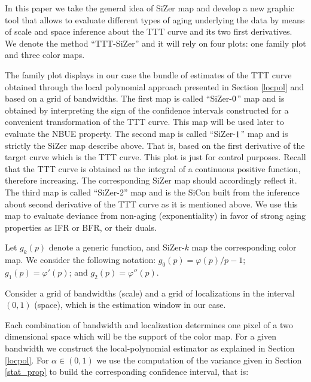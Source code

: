 \documentclass[preprint,12pt]{elsarticle}
\begin{document}
In this paper we take the general idea of SiZer map and develop a new graphic tool that allows to evaluate different types of aging underlying the data by means of scale and space inference about the TTT curve and its two first derivatives. We denote the method ``TTT-SiZer'' and it will rely on four plots: one family plot and three color maps.


The family plot displays in our case the bundle of estimates of the  TTT curve  obtained through the local polynomial approach presented in Section \ref{locpol} and based on a grid of bandwidths.
The first map is called ``SiZer-${\rm 0}$'' map and is obtained by interpreting the sign of the confidence intervals constructed for a convenient transformation of the TTT curve. This map will be used later to evaluate the NBUE property.
The second map is called ``SiZer-${\rm 1}$'' map and is strictly the SiZer map describe above. That is, based on the first derivative of the target curve which is the TTT curve. This plot is just for control purposes. Recall that the TTT curve is obtained as the integral of a continuous positive function, therefore increasing. The corresponding SiZer map should accordingly reflect it. 
The third map is called ``SiZer-{\rm 2}'' map and is the  SiCon  built from the inference about second derivative of the TTT curve as it is mentioned above. We use this map to evaluate deviance from non-aging (exponentiality) in favor of strong aging properties as IFR or BFR, or their duals.

 Let $g_k(p)$ denote a generic function, and SiZer-${ k}$ map the corresponding color map. We consider the following notation: $g_0(p)=\varphi(p)/p-1$; $g_1(p)=\varphi'(p)$; and  $g_2(p)=\varphi''(p)$. 

Consider a grid of bandwidths (scale) and a grid of localizations in the interval $(0,1)$  (space), which is the estimation window in our case. 

Each combination of bandwidth and localization determines one pixel of a two dimensional space which will be the support of the color map. For a given bandwidth we construct the local-polynomial estimator as explained in Section \ref{locpol}. For $\alpha \in (0,1)$ we use the computation of the variance given in Section \ref{stat_prop} to build the corresponding confidence interval, that is:
 
\end{document}
